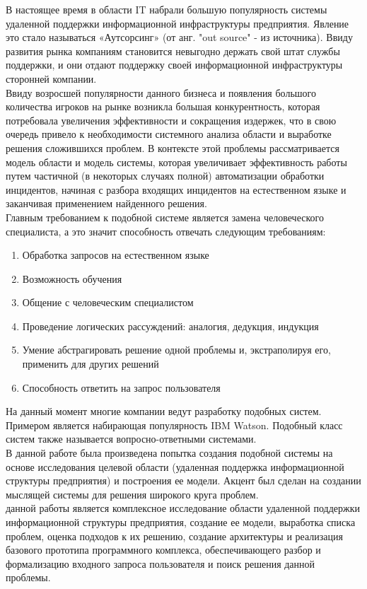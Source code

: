 {\actuality}
В настоящее время в области IT набрали большую популярность системы удаленной поддержки информационной инфраструктуры предприятия. Явление это стало называться «Аутсорсинг» (от анг. "out source" - из источника). Ввиду развития рынка компаниям становится невыгодно держать свой штат службы поддержки, и они отдают поддержку своей информационной инфраструктуры сторонней компании. \\
Ввиду возросшей популярности данного бизнеса и появления большого количества игроков на рынке возникла большая конкурентность, которая потребовала увеличения эффективности и сокращения издержек, что в свою очередь привело к необходимости системного анализа области и выработке решения сложившихся проблем. В контексте этой проблемы рассматривается модель области и модель системы, которая увеличивает эффективность работы путем частичной (в некоторых случаях полной) автоматизации обработки инцидентов, начиная с разбора входящих инцидентов на естественном языке и заканчивая применением найденного решения. \\
Главным требованием к подобной системе является замена человеческого специалиста, а это значит способность отвечать следующим требованиям:
\begin{enumerate}
  \item Обработка запросов на естественном языке
  \item Возможность обучения
  \item Общение с человеческим специалистом
  \item Проведение логических рассуждений: аналогия, дедукция, индукция
  \item Умение абстрагировать решение одной проблемы и, экстраполируя его, применить для других решений
  \item Способность ответить на запрос пользователя
\end{enumerate}

На данный момент многие компании ведут разработку подобных систем. Примером является набирающая популярность IBM Watson. Подобный класс систем также называется вопросно-ответными системами. \\
В данной работе была произведена попытка создания подобной системы на основе исследования целевой области (удаленная поддержка информационной структуры предприятия) и построения ее модели.
 Акцент был сделан на создании мыслящей системы для решения широкого круга проблем. \\
 
{\aim} данной работы является комплексное исследование области удаленной поддержки информационной структуры предприятия, создание ее модели, выработка списка проблем, оценка подходов к их решению,  создание архитектуры и реализация базового прототипа программного комплекса, обеспечивающего разбор и формализацию входного запроса пользователя и поиск решения данной проблемы.


